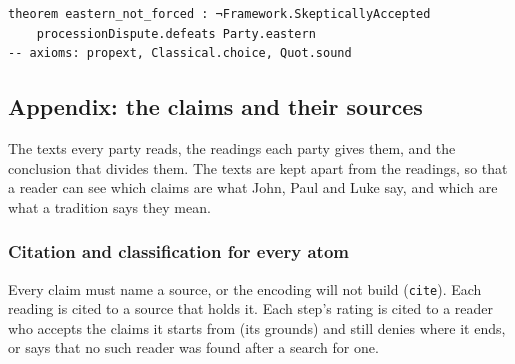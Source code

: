\documentclass[11pt,paper=\testimonypaper,DIV=13,parskip=false]{scrartcl}
\begin{document}
{\small\begin{verbatim}
theorem eastern_not_forced : ¬Framework.SkepticallyAccepted
    processionDispute.defeats Party.eastern
-- axioms: propext, Classical.choice, Quot.sound
\end{verbatim}}
\subsection*{Appendix: the claims and their sources}
The texts every party reads, the readings each party gives them, and the conclusion that divides them. The texts are kept apart from the readings, so that a reader can see which claims are what John, Paul and Luke say, and which are what a tradition says they mean.

\subsubsection*{Citation and classification for every atom}
Every claim must name a source, or the encoding will not build (\texttt{cite}). Each reading is cited to a source that holds it. Each step’s rating is cited to a reader who accepts the claims it starts from (its grounds) and still denies where it ends, or says that no such reader was found after a search for one.
\end{document}
